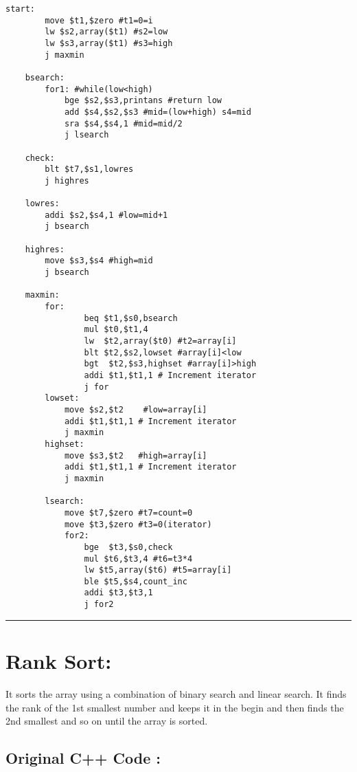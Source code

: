 \documentclass[a4paper,10pt]{article} %
\begin{document}
\begin{codebox} 
\begin{lstlisting}[language=Assembly]
start:
		move $t1,$zero #t1=0=i
		lw $s2,array($t1) #s2=low
		lw $s3,array($t1) #s3=high
		j maxmin
	
	bsearch:
		for1: #while(low<high)
			bge $s2,$s3,printans #return low
			add $s4,$s2,$s3 #mid=(low+high) s4=mid
			sra $s4,$s4,1 #mid=mid/2
			j lsearch
	
	check:
		blt $t7,$s1,lowres
		j highres
		
	lowres:
		addi $s2,$s4,1 #low=mid+1
		j bsearch
		
	highres:
		move $s3,$s4 #high=mid
		j bsearch	
			
	maxmin:
		for:
    			beq $t1,$s0,bsearch
    			mul $t0,$t1,4
    			lw  $t2,array($t0) #t2=array[i]
    			blt $t2,$s2,lowset #array[i]<low
    			bgt  $t2,$s3,highset #array[i]>high
    			addi $t1,$t1,1 # Increment iterator
    			j for
    	lowset:
    		move $s2,$t2 	#low=array[i]
    		addi $t1,$t1,1 # Increment iterator
    		j maxmin
    	highset:
    		move $s3,$t2   #high=array[i]
    		addi $t1,$t1,1 # Increment iterator
    		j maxmin
    	
    	lsearch:
    		move $t7,$zero #t7=count=0
    		move $t3,$zero #t3=0(iterator)
    		for2:
    			bge  $t3,$s0,check
    			mul $t6,$t3,4 #t6=t3*4
    			lw $t5,array($t6) #t5=array[i]
    			ble $t5,$s4,count_inc
    			addi $t3,$t3,1
    			j for2
\end{lstlisting} 
\end{codebox}
\newpage

\rule{\textwidth}{0.5pt}
\section*{\huge{\textbf{Rank Sort:}}}

It sorts the array using a combination of binary search and linear search. It finds the rank of the 1st smallest number and keeps it in the begin and then finds the 2nd smallest and so on until the array is sorted.

\subsection*{\Large{Original C++ Code :}}
\end{document}
